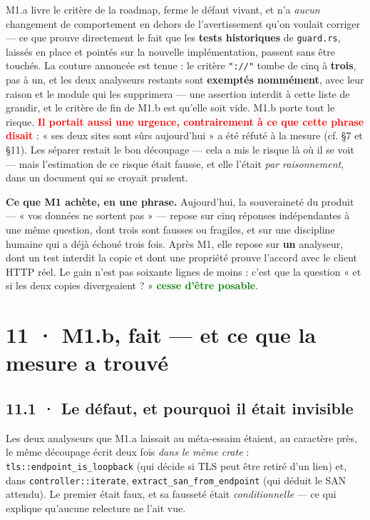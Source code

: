\documentclass[10pt]{article}
\newcommand{\best}[1]{\textcolor{green}{\textbf{#1}}}
\newcommand{\pire}[1]{\textcolor{red}{\textbf{#1}}}
\newcommand{\code}[1]{\texttt{\small #1}}
\begin{document}
M1.a livre le critère de la roadmap, ferme le défaut vivant, et n'a \emph{aucun} changement de
comportement en dehors de l'avertissement qu'on voulait corriger --- ce que prouve directement le
fait que les \textbf{tests historiques} de \code{guard.rs}, laissés en place et pointés sur la
nouvelle implémentation, passent sans être touchés. La couture annoncée est tenue : le critère
\code{"://"} tombe de cinq à \textbf{trois}, pas à un, et les deux analyseurs restants sont
\textbf{exemptés nommément}, avec leur raison et le module qui les supprimera --- une assertion
interdit à cette liste de grandir, et le critère de fin de M1.b est qu'elle soit vide. M1.b porte tout
le risque. \pire{Il portait aussi une urgence, contrairement à ce que cette phrase disait} : « ses
deux sites sont sûrs aujourd'hui » a été réfuté à la mesure (cf. §7 et §11). Les séparer restait le
bon découpage --- cela a mis le risque là où il se voit --- mais l'estimation de ce risque était
fausse, et elle l'était \emph{par raisonnement}, dans un document qui se croyait prudent.

\begin{acquis}
\textbf{Ce que M1 achète, en une phrase.} Aujourd'hui, la souveraineté du produit --- « vos données
ne sortent pas » --- repose sur cinq réponses indépendantes à une même question, dont trois sont
fausses ou fragiles, et sur une discipline humaine qui a déjà échoué trois fois. Après M1, elle
repose sur \textbf{un} analyseur, dont un test interdit la copie et dont une propriété prouve
l'accord avec le client HTTP réel. Le gain n'est pas soixante lignes de moins : c'est que la question
« et si les deux copies divergeaient ? » \best{cesse d'être posable}.
\end{acquis}

\section{11 · M1.b, fait --- et ce que la mesure a trouvé}

\subsection{11.1 · Le défaut, et pourquoi il était invisible}

Les deux analyseurs que M1.a laissait au méta-essaim étaient, au caractère près, le même découpage
écrit deux fois \emph{dans le même crate} : \code{tls::endpoint\_is\_loopback} (qui décide si TLS
peut être retiré d'un lien) et, dans \code{controller::iterate},
\code{extract\_san\_from\_endpoint} (qui déduit le SAN attendu). Le premier était faux, et sa fausseté était \emph{conditionnelle} --- ce qui
explique qu'aucune relecture ne l'ait vue.
\end{document}
